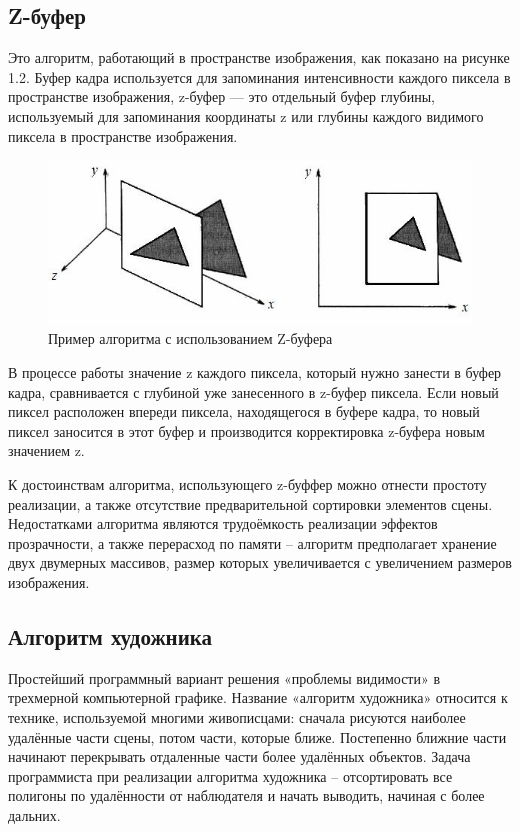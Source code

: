 \documentclass[12pt,a4paper,oneside]{report}
\begin{document}
	\subsection{Z-буфер}
	 \quad Это алгоритм, работающий в пространстве изображения, как показано на рисунке 1.2. Буфер кадра используется для запоминания интенсивности каждого пиксела в пространстве изображения, z-буфер — это отдельный буфер глубины, используемый для запоминания координаты z или глубины каждого видимого пиксела в пространстве изображения. 

	\begin{figure}[h]
		\centering
		\includegraphics[scale=0.6]{z-buffer}
		\caption{Пример алгоритма с использованием Z-буфера}
	\end{figure}
	
	 В процессе работы значение z каждого пиксела, который нужно занести в буфер кадра, сравнивается с глубиной уже занесенного в z-буфер пиксела. Если новый пиксел расположен впереди пиксела, находящегося в буфере кадра, то новый пиксел заносится в этот буфер и производится корректировка z-буфера новым значением z. 
	
	 К достоинствам алгоритма, использующего z-буффер можно отнести простоту реализации, а также отсутствие предварительной сортировки элементов сцены. Недостатками алгоритма являются трудоёмкость реализации эффектов прозрачности, а также перерасход по памяти -- алгоритм предполагает хранение двух двумерных массивов, размер которых увеличивается с увеличением размеров изображения.
	
	
 	\subsection{Алгоритм художника}
 	\quad Простейший программный вариант решения «проблемы видимости» в трехмерной компьютерной графике\cite{s}.
 	Название «алгоритм художника» относится к технике, используемой многими живописцами: сначала рисуются наиболее удалённые части сцены, потом части, которые ближе. Постепенно ближние части начинают перекрывать отдаленные части более удалённых объектов. Задача программиста при реализации алгоритма художника -- отсортировать все полигоны по удалённости от наблюдателя и начать выводить, начиная с более дальних. 
 	
\end{document}

